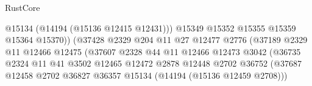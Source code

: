 \begin{lexlean}{RustCore}
\begin{coremodule}
                                                    @15134
                                                    (@14194 (@15136 @12415 @12431)))
                                                  @15349
                                                  @15352
                                                  @15355
                                                  @15359
                                                  @15364
                                                  @15370))
                                              (@37428
                                                @2329
                                                @204
                                                @11
                                                @27
                                                @12477
                                                @2776
                                                (@37189
                                                  @2329
                                                  @11
                                                  @12466
                                                  @12475
                                                  (@37607
                                                    @2328
                                                    @44
                                                    @11
                                                    @12466
                                                    @12473
                                                    @3042
                                                    (@36735
                                                      @2324
                                                      @11
                                                      @41
                                                      @3502
                                                      @12465
                                                      @12472
                                                      @2878
                                                      @12448
                                                      @2702
                                                      @36752
                                                      (@37687
                                                        @12458
                                                        @2702
                                                        @36827
                                                        @36357
                                                        @15134
                                                        (@14194 (@15136 @12459 @2708)))

\end{coremodule}
\end{lexlean}
